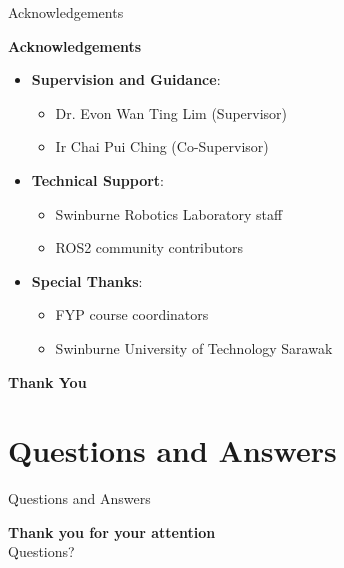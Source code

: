 \documentclass[aspectratio=169]{beamer}
\begin{document}
\begin{frame}{Acknowledgements}
	\begin{center}
		\large \textbf{Acknowledgements}
	\end{center}
	\begin{itemize}
		\item \textbf{Supervision and Guidance}:
		      \begin{itemize}
			      \item Dr. Evon Wan Ting Lim (Supervisor)
			      \item Ir Chai Pui Ching (Co-Supervisor)
		      \end{itemize}
		\item \textbf{Technical Support}:
		      \begin{itemize}
			      \item Swinburne Robotics Laboratory staff
			      \item ROS2 community contributors
		      \end{itemize}
		\item \textbf{Special Thanks}:
		      \begin{itemize}
			      \item FYP course coordinators
			      \item Swinburne University of Technology Sarawak
		      \end{itemize}
	\end{itemize}
	\vspace{0.5cm}
	\begin{center}
		\large \textbf{Thank You}
	\end{center}
\end{frame}

\section{Questions and Answers}
\begin{frame}{Questions and Answers}
	\begin{center}
		\large \textbf{Thank you for your attention}\\[0.5cm]
		Questions?
	\end{center}
\end{frame}
\end{document}

